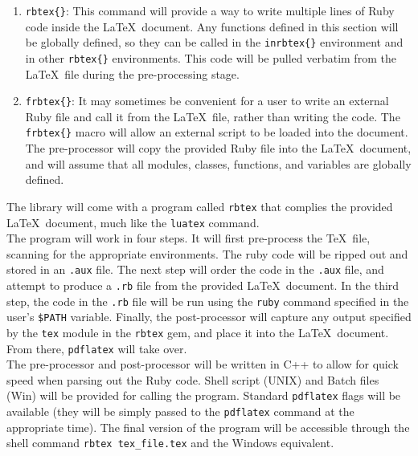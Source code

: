 \documentclass{article}
\newcommand{\inlinecode}[1]{\texttt{#1}}
\begin{document}
\begin{enumerate}
\item \inlinecode{rbtex\{\}}: This command will provide a way to write multiple lines of Ruby code
inside the \LaTeX\ document. Any functions defined in this section will be globally defined, so
they can be called in the \inlinecode{inrbtex\{\}} environment and in other \inlinecode{rbtex\{\}}
environments. This code will be pulled verbatim from the \LaTeX\ file during the pre-processing
stage.
\item \inlinecode{frbtex\{\}}: It may sometimes be convenient for a user to write an external Ruby
file and call it from the \LaTeX\ file, rather than writing the code. The \inlinecode{frbtex\{\}}
macro will allow an external script to be loaded into the document. The pre-processor will copy
the provided Ruby file into the \LaTeX\ document, and will assume that all modules, classes,
functions, and variables are globally defined.
\end{enumerate}

The library will come with a program called \inlinecode{rbtex} that complies the provided \LaTeX\
document, much like the \inlinecode{luatex} command.\\

The program will work in four steps. It will first pre-process the \TeX\ file, scanning for the
appropriate environments. The ruby code will be ripped out and stored in an \inlinecode{.aux}
file. The next step will order the code in the \inlinecode{.aux} file, and attempt to produce a
\inlinecode{.rb} file from the provided \LaTeX\ document. In the third step, the code in the
\inlinecode{.rb} file will be run using the \inlinecode{ruby} command specified in the user's
\inlinecode{\$PATH} variable. Finally, the post-processor will capture any output specified by the
\inlinecode{tex} module in the \inlinecode{rbtex} gem, and place it into the \LaTeX\ document.
From there, \inlinecode{pdflatex} will take over.\\

The pre-processor and post-processor will be written in C++ to allow for quick speed when parsing
out the Ruby code. Shell script (UNIX) and Batch files (Win) will be provided for calling the
program. Standard \inlinecode{pdflatex} flags will be available (they will be simply passed to the
\inlinecode{pdflatex} command at the appropriate time). The final version of the program will be
accessible through the shell command \inlinecode{rbtex tex\_file.tex} and the Windows equivalent.
\end{document}
